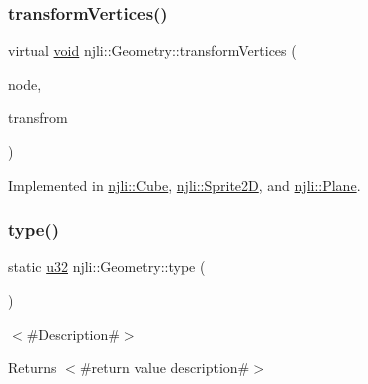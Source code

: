 \mbox{\label{classnjli_1_1_geometry_a25fefe3f656bdcb8c88d2fd4d2f48df1}} 
\subsubsection{\texorpdfstring{transform\+Vertices()}{transformVertices()}}
{\footnotesize\ttfamily virtual \mbox{\hyperlink{_thread_8h_af1e856da2e658414cb2456cb6f7ebc66}{void}} njli\+::\+Geometry\+::transform\+Vertices (\begin{DoxyParamCaption}\item[{\mbox{\hyperlink{classnjli_1_1_node}{Node}} $\ast$}]{node,  }\item[{const bt\+Transform \&}]{transfrom }\end{DoxyParamCaption})\hspace{0.3cm}{\ttfamily [pure virtual]}}



Implemented in \mbox{\hyperlink{classnjli_1_1_cube_ad3a57659a9ad27cbd21254db444ac49f}{njli\+::\+Cube}}, \mbox{\hyperlink{classnjli_1_1_sprite2_d_a357c517b9064bf729722e3cff9312dd0}{njli\+::\+Sprite2D}}, and \mbox{\hyperlink{classnjli_1_1_plane_aeb45c844627228083af4f2dd4d6b5010}{njli\+::\+Plane}}.

\mbox{\label{classnjli_1_1_geometry_a144e779681b19041b60e129cbf7cac29}} 
\subsubsection{\texorpdfstring{type()}{type()}}
{\footnotesize\ttfamily static \mbox{\hyperlink{_util_8h_a10e94b422ef0c20dcdec20d31a1f5049}{u32}} njli\+::\+Geometry\+::type (\begin{DoxyParamCaption}{ }\end{DoxyParamCaption})\hspace{0.3cm}{\ttfamily [static]}}

$<$\#\+Description\#$>$

\begin{DoxyReturn}{Returns}
$<$\#return value description\#$>$ 
\end{DoxyReturn}
\mbox{\label{classnjli_1_1_geometry_a0c5960113b3cd040e7df7b8d2104f7a3}} 
